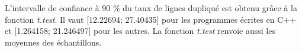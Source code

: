 L'intervalle de confiance à 90 \% du taux de lignes dupliqué est
obtenu grâce à la fonction \emph{t.test}. Il vaut [12.22694; 27.40435]
pour les programmes écrites en C++ et [1.264158; 21.246497] pour les
autres. La fonction \emph{t.test} renvoie aussi les moyennes des
échantillons.

